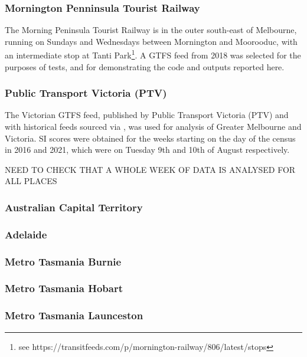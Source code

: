 \documentclass[preprint, 3p,
authoryear]{elsarticle} %
\begin{document}
\subsubsection{Mornington Penninsula Tourist
Railway}\label{mornington-penninsula-tourist-railway}

The Morning Peninsula Tourist Railway is in the outer south-east of
Melbourne, running on Sundays and Wednesdays between Mornington and
Moorooduc, with an intermediate stop at Tanti Park\footnote{see
  https://transitfeeds.com/p/mornington-railway/806/latest/stops}. A
GTFS feed from 2018 was selected for the purposes of tests, and for
demonstrating the code and outputs reported here.

\subsubsection{Public Transport Victoria
(PTV)}\label{public-transport-victoria-ptv}

The Victorian GTFS feed, published by Public Transport Victoria (PTV)
and with historical feeds sourced via
\citet{transitfeeds_victoria:2023aa}, was used for analysis of Greater
Melbourne and Victoria. SI scores were obtained for the weeks starting
on the day of the census in 2016 and 2021, which were on Tuesday 9th and
10th of August respectively.

NEED TO CHECK THAT A WHOLE WEEK OF DATA IS ANALYSED FOR ALL PLACES

\subsubsection{Australian Capital
Territory}\label{australian-capital-territory}

\subsubsection{Adelaide}\label{adelaide}

\subsubsection{Metro Tasmania Burnie}\label{metro-tasmania-burnie}

\subsubsection{Metro Tasmania Hobart}\label{metro-tasmania-hobart}

\subsubsection{Metro Tasmania
Launceston}\label{metro-tasmania-launceston}
\end{document}
